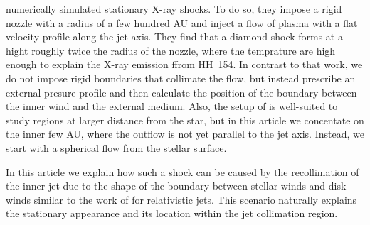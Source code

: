 \citet{2011ApJ...737...54B} numerically simulated stationary X-ray shocks. To do so, they impose a rigid nozzle with a radius of a few hundred AU and inject a flow of plasma with a flat velocity profile along the jet axis. They find that a diamond shock forms at a hight roughly twice the radius of the nozzle, where the temprature are high enough to explain the X-ray emission ffrom HH~154. In contrast to that work, we do not impose rigid boundaries that collimate the flow, but instead prescribe an external presure profile and then calculate the position of the boundary between the inner wind and the external medium. Also, the setup of \citet{2011ApJ...737...54B} is well-suited to study regions at larger distance from the star, but in this article we concentate on the inner few AU, where the outflow is not yet parallel to the jet axis. Instead, we start with a spherical flow from the stellar surface.

In this article we explain how such a shock can be caused by the recollimation of the inner jet due to the shape of the boundary between stellar winds and disk winds similar to the work of \citet{2012MNRAS.422.2282K} for relativistic jets. This scenario naturally explains the stationary appearance and its location within the jet collimation region.